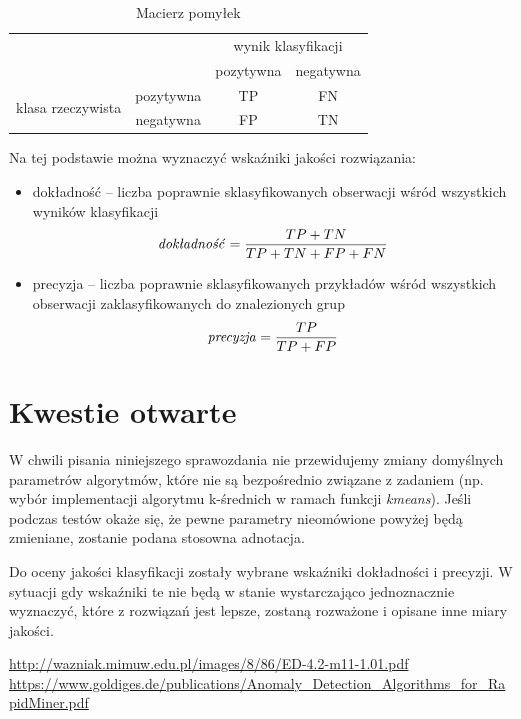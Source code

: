 \documentclass[11pt,a4paper,twoside]{article}
\begin{document}
\begin{table}[ht]
\centering
\caption{Macierz pomyłek}
\label{confusionMatrix}
\begin{tabular}{|*{4}{c|}}
\cline{3-4}
  \multicolumn{2}{c}{} & \multicolumn{2}{|c|}{wynik klasyfikacji}\\\cline{3-4}
  \multicolumn{2}{c|}{} & pozytywna & negatywna\\\hline
  \multirow{2}{*}{klasa rzeczywista}& pozytywna & TP & FN\\\cline{2-4}
  & negatywna & FP & TN\\\hline
\end{tabular}
\end{table}

Na tej podstawie można wyznaczyć wskaźniki jakości rozwiązania:
\begin{itemize}[label={--}]
\item dokładność -- liczba poprawnie sklasyfikowanych obserwacji wśród wszystkich wyników klasyfikacji $$\text{\emph{dokładność}} = \frac{TP+TN}{TP+TN+FP+FN}$$
\item precyzja -- liczba poprawnie sklasyfikowanych przykładów wśród wszystkich obserwacji zaklasyfikowanych do znalezionych grup $$\text{\emph{precyzja}} = \frac{TP}{TP+FP}$$
\end{itemize}


\section{Kwestie otwarte}
W chwili pisania niniejszego sprawozdania nie przewidujemy zmiany domyślnych parametrów algorytmów, które nie są bezpośrednio związane z zadaniem (np. wybór implementacji algorytmu k-średnich w ramach funkcji \textit{kmeans}). Jeśli podczas testów okaże się, że pewne parametry nieomówione powyżej będą zmieniane, zostanie podana stosowna adnotacja.

Do oceny jakości klasyfikacji zostały wybrane wskaźniki dokładności i precyzji. W sytuacji gdy wskaźniki te nie będą w stanie wystarczająco jednoznacznie wyznaczyć, które z rozwiązań jest lepsze, zostaną rozważone i opisane inne miary jakości.

\begin{thebibliography}{9}
\url{http://wazniak.mimuw.edu.pl/images/8/86/ED-4.2-m11-1.01.pdf}
\url{https://www.goldiges.de/publications/Anomaly_Detection_Algorithms_for_RapidMiner.pdf}


\end{thebibliography}
\end{document}
